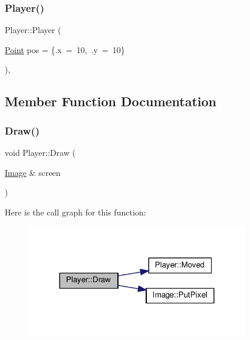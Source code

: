 \subsubsection{\texorpdfstring{Player()}{Player()}}
{\footnotesize\ttfamily Player\+::\+Player (\begin{DoxyParamCaption}\item[{\hyperlink{structPoint}{Point}}]{pos = {\ttfamily \{.x~=~10,~.y~=~10\}} }\end{DoxyParamCaption})\hspace{0.3cm}{\ttfamily [inline]}, {\ttfamily [explicit]}}



\subsection{Member Function Documentation}
\mbox{\label{structPlayer_a1a10995b61d63b46c6b562bd026382c4}} 
\subsubsection{\texorpdfstring{Draw()}{Draw()}}
{\footnotesize\ttfamily void Player\+::\+Draw (\begin{DoxyParamCaption}\item[{\hyperlink{structImage}{Image} \&}]{screen }\end{DoxyParamCaption})}

Here is the call graph for this function\+:
\nopagebreak
\begin{figure}[H]
\begin{center}
\leavevmode
\includegraphics[width=276pt]{structPlayer_a1a10995b61d63b46c6b562bd026382c4_cgraph}
\end{center}
\end{figure}
\mbox{\label{structPlayer_a743da3dcbc81ed11bfcb81943aae175b}} 
